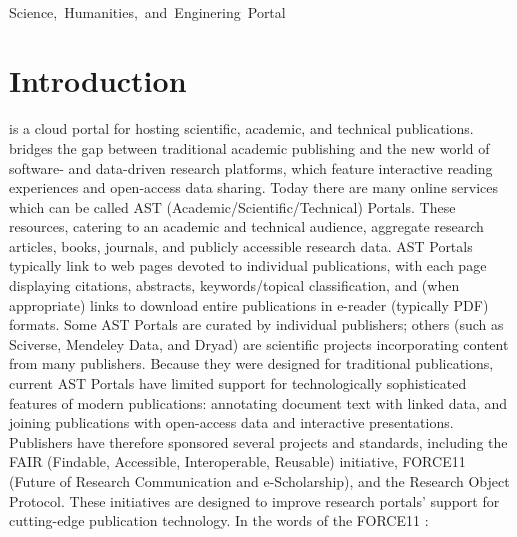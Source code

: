 \documentclass[10pt,letterpaper]{article}
\begin{document}
\begin{center}
{}\\\vspace{2pt}
\mbox{Science, Humanities, and Enginering Portal}\\\vspace{3pt}
\end{center}

\vspace*{-5pt}


\section{Introduction}
{\lfMOSAIC} is a cloud portal for hosting scientific, academic, and 
technical publications.  {\MOSAIC} bridges the gap between 
traditional academic publishing and the new 
world of software- and data-driven research platforms, 
which feature interactive reading experiences 
and open-access data sharing.
\p{}
Today there are many online services which 
can be called AST (Academic/Scientific/Technical) Portals.
These resources, catering 
to an academic and technical audience, aggregate 
research articles, books, journals, and publicly accessible 
research data.  
AST Portals typically link to web pages devoted to individual 
publications, with each page displaying citations, 
abstracts, keywords/topical classification, and 
(when appropriate) links to download entire 
publications in e-reader (typically PDF) formats.  
Some AST Portals are curated by 
individual publishers; others (such as Sciverse, Mendeley Data, 
and Dryad) are scientific projects  
incorporating content from many publishers.
\p{}
Because they were designed for traditional publications, 
current AST Portals have limited 
support for technologically sophisticated 
features of modern publications: annotating 
document text with linked data, and joining 
publications with open-access data and interactive 
presentations.  Publishers have therefore 
sponsored several projects and standards, including 
the FAIR (Findable, Accessible, Interoperable, 
Reusable) initiative, 
FORCE11 (Future of Research Communication and e-Scholarship), 
and the Research Object 
Protocol.  These initiatives are designed to 
improve research portals' support for cutting-edge 
publication technology.  In the 
words of the FORCE11 :
\qvspace{}
\end{document}
